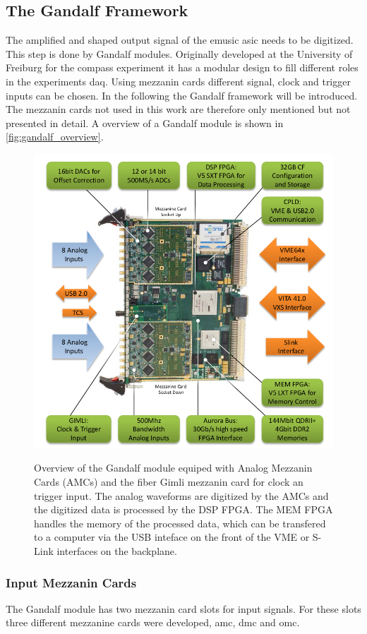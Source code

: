 \subsection{The Gandalf Framework}
The amplified and shaped output signal of the \ac{emusic} \ac{asic} needs to be digitized.
This step is done by Gandalf modules.
Originally developed at the University of Freiburg for the \ac{compass} experiment it has a modular design to fill different roles in the experiments \ac{daq}.
Using mezzanin cards different signal, clock and trigger inputs can be chosen.
In the following the Gandalf framework will be introduced.
The mezzanin cards not used in this work are therefore only mentioned but not presented in detail.
A overview of a Gandalf module is shown in \autoref{fig:gandalf_overview}.
\begin{figure}
	\centering
	\includegraphics[width=1.\linewidth]{pictures/gandalf_overview.png}
	\label{fig:gandalf_overview}
	\caption{Overview of the Gandalf module equiped with Analog Mezzanin Cards (AMCs) and the fiber Gimli mezzanin card for clock an trigger input. The analog waveforms are digitized by the AMCs and the digitized data is processed by the DSP FPGA. The MEM FPGA handles the memory of the processed data, which can be transfered to a computer via the USB inteface on the front of the VME or S-Link interfaces on the backplane. \cite{herrmann}}
\end{figure}

\subsubsection{Input Mezzanin Cards}
The Gandalf module has two mezzanin card slots for input signals.
For these slots three different mezzanine cards were developed, \ac{amc}, \ac{dmc} and \ac{omc}.

